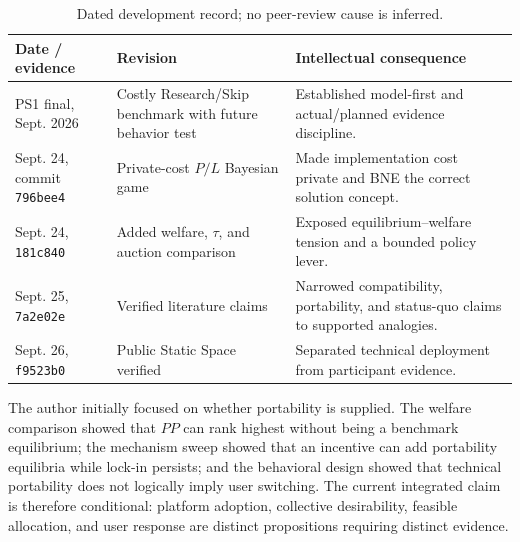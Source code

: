 \begin{table}[h]
\caption{Dated development record; no peer-review cause is inferred.}
\begin{tabularx}{\columnwidth}{@{}p{1.6cm}p{1.85cm}Y@{}}\toprule
\textbf{Date / evidence}&\textbf{Revision}&\textbf{Intellectual consequence}\\\midrule
PS1 final, Sept. 2026&Costly Research/Skip benchmark with future behavior test&Established model-first and actual/planned evidence discipline.\\
Sept. 24, commit \texttt{796bee4}&Private-cost $P/L$ Bayesian game&Made implementation cost private and BNE the correct solution concept.\\
Sept. 24, \texttt{181c840}&Added welfare, $\tau$, and auction comparison&Exposed equilibrium--welfare tension and a bounded policy lever.\\
Sept. 25, \texttt{7a2e02e}&Verified literature claims&Narrowed compatibility, portability, and status-quo claims to supported analogies.\\
Sept. 26, \texttt{f9523b0}&Public Static Space verified&Separated technical deployment from participant evidence.\\\bottomrule
\end{tabularx}
\end{table}

The author initially focused on whether portability is supplied. The welfare comparison showed that $PP$ can rank highest without being a benchmark equilibrium; the mechanism sweep showed that an incentive can add portability equilibria while lock-in persists; and the behavioral design showed that technical portability does not logically imply user switching. The current integrated claim is therefore conditional: platform adoption, collective desirability, feasible allocation, and user response are distinct propositions requiring distinct evidence.

